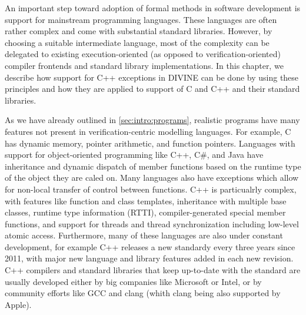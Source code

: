 
\bigskip\noindent
An important step toward adoption of formal methods in software development is
support for mainstream programming languages.
These languages are often rather complex and come with substantial standard
libraries.
However, by choosing a suitable intermediate language, most of the complexity
can be delegated to existing execution-oriented (as opposed to
verification-oriented) compiler frontends and standard library implementations.
In this chapter, we describe how support for C++ exceptions in DIVINE can be done by using these principles and how they are applied to support of C and C++ and their standard libraries.


As we have already outlined in \autoref{sec:intro:programs}, realistic
programs have many features not present in verification-centric modelling
languages.
For example, C has dynamic memory, pointer arithmetic, and function pointers.
Languages with support for object-oriented programming like C++, C\#, and Java
have inheritance and dynamic dispatch of member functions based on the runtime
type of the object they are caled on.
Many languages also have exceptions which allow for non-local transfer of
control between functions.
C++ is particualrly complex, with features like function and class
templates,%
inheritance with multiple base classes, runtime type information (RTTI),
compiler-generated special member functions,%
and support for threads and thread synchronization including low-level atomic
access.
Furthermore, many of these languages are also under constant development,
for example C++ releases a new standardy every three years since 2011, with
major new language and library features added in each new revision.
C++ compilers and standard libraries that keep up-to-date with the standard
are usually developed either by big companies like Microsoft or Intel, or by
community efforts like GCC and clang (whith clang being also supported by
Apple).

